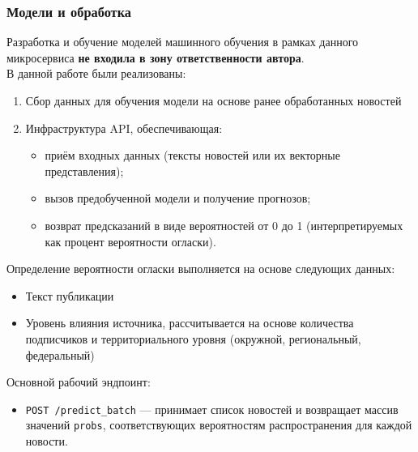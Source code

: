 \hypertarget{ux43cux43eux434ux435ux43bux438-ux438-ux43eux431ux440ux430ux431ux43eux442ux43aux430}{%
\subsubsection{\texorpdfstring{\textbf{Модели и
обработка}}{Модели и обработка}}\label{ux43cux43eux434ux435ux43bux438-ux438-ux43eux431ux440ux430ux431ux43eux442ux43aux430}}

Разработка и обучение моделей машинного обучения в рамках данного
микросервиса \textbf{не входила в зону ответственности автора}.\\
В данной работе были реализованы:

\begin{enumerate}
\def\labelenumi{\arabic{enumi}.}
\tightlist
\item
  Сбор данных для обучения модели на основе ранее обработанных
  новостей\\
\item
  Инфраструктура API, обеспечивающая:

  \begin{itemize}
  \tightlist
  \item
    приём входных данных (тексты новостей или их векторные
    представления);\\
  \item
    вызов предобученной модели и получение прогнозов;\\
  \item
    возврат предсказаний в виде вероятностей от 0 до 1 (интерпретируемых
    как процент вероятности огласки).
  \end{itemize}
\end{enumerate}

Определение вероятности огласки выполняется на основе следующих данных:

\begin{itemize}
\tightlist
\item
  Текст публикации\\
\item
  Уровень влияния источника, рассчитывается на основе количества
  подписчиков и территориального уровня (окружной, региональный,
  федеральный)
\end{itemize}

Основной рабочий эндпоинт:

\begin{itemize}
\tightlist
\item
  \texttt{POST\ /predict\_batch} --- принимает список новостей и
  возвращает массив значений \texttt{probs}, соответствующих
  вероятностям распространения для каждой новости.
\end{itemize}

